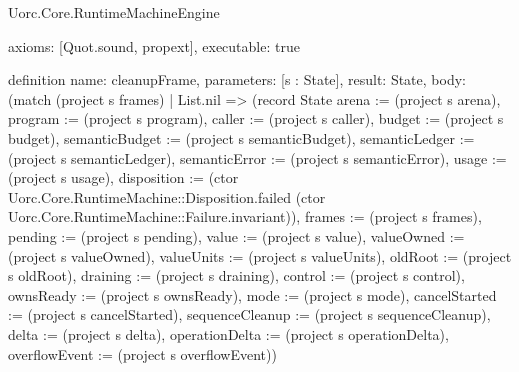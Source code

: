 \begin{lexlean}{Uorc.Core.RuntimeMachineEngine}
\begin{semanticmodule}
{  axioms: [Quot.sound, propext],
  executable: true
}

definition{
  name: cleanupFrame,
  parameters: [s : State],
  result: State,
  body: (match (project s frames)
    | List.nil => (record State {arena := (project s arena), program := (project s program), caller := (project s caller), budget := (project s budget), semanticBudget := (project s semanticBudget), semanticLedger := (project s semanticLedger), semanticError := (project s semanticError), usage := (project s usage), disposition := (ctor Uorc.Core.RuntimeMachine::Disposition.failed (ctor Uorc.Core.RuntimeMachine::Failure.invariant)), frames := (project s frames), pending := (project s pending), value := (project s value), valueOwned := (project s valueOwned), valueUnits := (project s valueUnits), oldRoot := (project s oldRoot), draining := (project s draining), control := (project s control), ownsReady := (project s ownsReady), mode := (project s mode), cancelStarted := (project s cancelStarted), sequenceCleanup := (project s sequenceCleanup), delta := (project s delta), operationDelta := (project s operationDelta), overflowEvent := (project s overflowEvent)})
}
\end{semanticmodule}
\end{lexlean}
